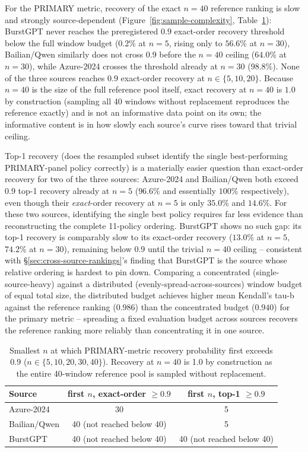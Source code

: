 For the PRIMARY metric, recovery of the exact $n=40$ reference ranking is
slow and strongly source-dependent (Figure~\ref{fig:sample-complexity},
Table~\ref{tab:rq4-first-n}): BurstGPT never reaches the preregistered
$0.9$ exact-order recovery threshold below the full window budget ($0.2\%$
at $n=5$, rising only to $56.6\%$ at $n=30$), Bailian/Qwen similarly does
not cross $0.9$ before the $n=40$ ceiling ($64.0\%$ at $n=30$), while Azure-2024
crosses the threshold already at $n=30$ ($98.8\%$). None of the three
sources reaches $0.9$ exact-order recovery at $n \in \{5,10,20\}$. Because
$n=40$ is the size of the full reference pool itself, exact recovery at
$n=40$ is $1.0$ by construction (sampling all 40 windows without
replacement reproduces the reference exactly) and is not an informative
data point on its own; the informative content is in how slowly each
source's curve rises toward that trivial ceiling.

Top-1 recovery (does the resampled subset identify the single
best-performing PRIMARY-panel policy correctly) is a materially easier
question than exact-order recovery for two of the three sources: Azure-2024
and Bailian/Qwen both exceed $0.9$ top-1 recovery already at $n=5$
($96.6\%$ and essentially $100\%$ respectively), even though their
\emph{exact}-order recovery at $n=5$ is only $35.0\%$ and $14.6\%$. For
these two sources, identifying the single best policy requires far less
evidence than reconstructing the complete 11-policy ordering. BurstGPT
shows no such gap: its top-1 recovery is comparably slow to its
exact-order recovery ($13.0\%$ at $n=5$, $74.2\%$ at $n=30$), remaining below
$0.9$ until the trivial $n=40$ ceiling -- consistent with
\S\ref{sec:cross-source-rankings}'s finding that BurstGPT is the source
whose relative ordering is hardest to pin down. Comparing a concentrated
(single-source-heavy) against a distributed (evenly-spread-across-sources)
window budget of equal total size, the distributed budget achieves higher
mean Kendall's tau-b against the reference ranking ($0.986$) than the
concentrated budget ($0.940$) for the primary metric -- spreading a fixed
evaluation budget across sources recovers the reference ranking more
reliably than concentrating it in one source.

\begin{table}[h]
\centering
\caption{Smallest $n$ at which PRIMARY-metric recovery probability first
exceeds $0.9$ ($n \in \{5,10,20,30,40\}$). Recovery at $n=40$ is 1.0 by
construction as the entire 40-window reference pool is sampled without
replacement.}
\label{tab:rq4-first-n}
\begin{tabular}{lcc}
\toprule
Source & first $n$, exact-order $\geq 0.9$ & first $n$, top-1 $\geq 0.9$ \\
\midrule
Azure-2024    & 30 & 5 \\
Bailian/Qwen  & 40 (not reached below 40) & 5 \\
BurstGPT      & 40 (not reached below 40) & 40 (not reached below 40) \\
\bottomrule
\end{tabular}
\end{table}


